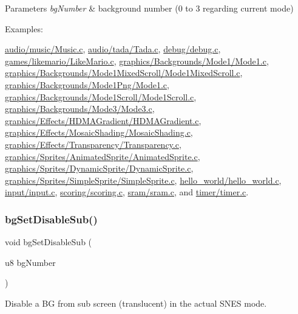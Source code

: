 \begin{DoxyParams}{Parameters}
{\em bg\+Number} & background number (0 to 3 regarding current mode) \\
\hline
\end{DoxyParams}
\begin{Desc}
\item[Examples\+: ]\par
\hyperlink{a00425}{audio/music/\+Music.\+c}, \hyperlink{a00427}{audio/tada/\+Tada.\+c}, \hyperlink{a00429}{debug/debug.\+c}, \hyperlink{a00423}{games/likemario/\+Like\+Mario.\+c}, \hyperlink{a00395}{graphics/\+Backgrounds/\+Mode1/\+Mode1.\+c}, \hyperlink{a00401}{graphics/\+Backgrounds/\+Mode1\+Mixed\+Scroll/\+Mode1\+Mixed\+Scroll.\+c}, \hyperlink{a00397}{graphics/\+Backgrounds/\+Mode1\+Png/\+Mode1.\+c}, \hyperlink{a00399}{graphics/\+Backgrounds/\+Mode1\+Scroll/\+Mode1\+Scroll.\+c}, \hyperlink{a00403}{graphics/\+Backgrounds/\+Mode3/\+Mode3.\+c}, \hyperlink{a00407}{graphics/\+Effects/\+H\+D\+M\+A\+Gradient/\+H\+D\+M\+A\+Gradient.\+c}, \hyperlink{a00409}{graphics/\+Effects/\+Mosaic\+Shading/\+Mosaic\+Shading.\+c}, \hyperlink{a00411}{graphics/\+Effects/\+Transparency/\+Transparency.\+c}, \hyperlink{a00415}{graphics/\+Sprites/\+Animated\+Sprite/\+Animated\+Sprite.\+c}, \hyperlink{a00417}{graphics/\+Sprites/\+Dynamic\+Sprite/\+Dynamic\+Sprite.\+c}, \hyperlink{a00413}{graphics/\+Sprites/\+Simple\+Sprite/\+Simple\+Sprite.\+c}, \hyperlink{a00391}{hello\+\_\+world/hello\+\_\+world.\+c}, \hyperlink{a00419}{input/input.\+c}, \hyperlink{a00433}{scoring/scoring.\+c}, \hyperlink{a00431}{sram/sram.\+c}, and \hyperlink{a00421}{timer/timer.\+c}.\end{Desc}
\mbox{\label{a00320_af28e4200f4e49073dcb8f950099bb9c3}} 
\subsubsection{\texorpdfstring{bg\+Set\+Disable\+Sub()}{bgSetDisableSub()}}
{\footnotesize\ttfamily void bg\+Set\+Disable\+Sub (\begin{DoxyParamCaption}\item[{u8}]{bg\+Number }\end{DoxyParamCaption})}



Disable a BG from sub screen (translucent) in the actual S\+N\+ES mode. 


